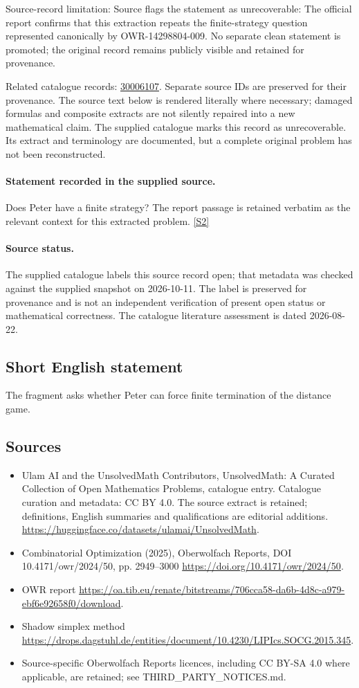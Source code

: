 \documentclass[11pt]{article}
\begin{document}
Source-record limitation: Source flags the statement as unrecoverable: The official report confirms that this extraction repeats the finite-strategy question represented canonically by OWR-14298804-009. No separate clean statement is promoted; the original record remains publicly visible and retained for provenance.

Related catalogue records: \href{https://mehmetmars7.github.io/Erdosproblems-llm-hunter/problem.html?type=open_problems&id=30006107}{30006107}. Separate source IDs are preserved for their provenance.
The source text below is rendered literally where necessary; damaged formulas and composite extracts are not silently repaired into a new mathematical claim.
The supplied catalogue marks this record as unrecoverable. Its extract and terminology are documented, but a complete original problem has not been reconstructed.
\paragraph{Statement recorded in the supplied source.}
Does Peter have a ﬁnite strategy? The report passage is retained verbatim as the relevant context for this extracted problem. \href{https://doi.org/10.4171/owr/2024/50}{[S2]}
\paragraph{Source status.}
The supplied catalogue labels this source record open; that metadata was checked against the supplied snapshot on 2026-10-11. The label is preserved for provenance and is not an independent verification of present open status or mathematical correctness. The catalogue literature assessment is dated 2026-08-22.
\subsection{Short English statement}
The fragment asks whether Peter can force finite termination of the distance game.
\subsection{Sources}
\begin{itemize}
\item[S1] Ulam AI and the UnsolvedMath Contributors, UnsolvedMath: A Curated Collection of Open Mathematics Problems, catalogue entry. Catalogue curation and metadata: CC BY 4.0. The source extract is retained; definitions, English summaries and qualifications are editorial additions.
\url{https://huggingface.co/datasets/ulamai/UnsolvedMath}.
\item[S2] Combinatorial Optimization (2025), Oberwolfach Reports, DOI 10.4171/owr/2024/50, pp. 2949--3000
\url{https://doi.org/10.4171/owr/2024/50}.
\item[S3] OWR report
\url{https://oa.tib.eu/renate/bitstreams/706cca58-da6b-4d8c-a979-ebf6e92658f0/download}.
\item[S4] Shadow simplex method
\url{https://drops.dagstuhl.de/entities/document/10.4230/LIPIcs.SOCG.2015.345}.
\item Source-specific Oberwolfach Reports licences, including CC BY-SA 4.0 where applicable, are retained; see THIRD\_PARTY\_NOTICES.md.
\end{itemize}
\end{document}

